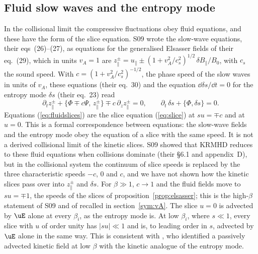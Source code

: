 \subsection{Fluid slow waves and the entropy mode}\label{sym:fluid}

In the collisional limit the compressive fluctuations obey fluid equations, and these have the form of the slice equation. S09 wrote the slow-wave equations, their eqs~(26)--(27), as equations for the generalised Elsasser fields of their eq.~(29), which in units $v_A=1$ are $z_\parallel^\pm=u_\parallel\pm(1+v_A^2/c_s^2)^{1/2}\,\delta B_\parallel/B_0$, with $c_s$ the sound speed. With $c=(1+v_A^2/c_s^2)^{-1/2}$, the phase speed of the slow waves in units of $v_A$, these equations (their eq.~30) and the equation $\dd\delta s/\dd t=0$ for the entropy mode $\delta s$ (their eq.~23) read
\begin{equation}\label{eq:fluidslices}
  \partial_tz_\parallel^\pm+\{\Phi\mp c\Psi,\,z_\parallel^\pm\}\mp c\,\partial_zz_\parallel^\pm=0,\qquad
  \partial_t\,\delta s+\{\Phi,\delta s\}=0 .
\end{equation}
Equations (\ref{eq:fluidslices}) are the slice equation (\ref{eq:slice}) at $su=\mp c$ and at $u=0$. This is a formal correspondence between equations: the slow-wave fields and the entropy mode obey the equation of a slice with the same speed. It is not a derived collisional limit of the kinetic slices. S09 showed that KRMHD reduces to these fluid equations when collisions dominate (their \S6.1 and appendix~D), but in the collisional system the continuum of slice speeds is replaced by the three characteristic speeds $-c$, $0$ and $c$, and we have not shown how the kinetic slices pass over into $z_\parallel^\pm$ and $\delta s$. For $\beta\gg1$, $c\to1$ and the fluid fields move to $su=\mp1$, the speeds of the slices of proposition~\ref{prop:elsasser}; this is the high-$\beta$ statement of S09 and of \citet{LithwickGoldreich2001} recalled in section~\ref{sym:vA}. The slice $u=0$ is advected by $\uE$ alone at every $\beta_i$, as the entropy mode is. At low $\beta_i$, where $s\ll1$, every slice with $u$ of order unity has $|su|\ll1$ and is, to leading order in $s$, advected by $\uE$ alone in the same way. This is consistent with \citet{Schekochihin2019}, who identified a passively advected kinetic field at low $\beta$ with the kinetic analogue of the entropy mode.
